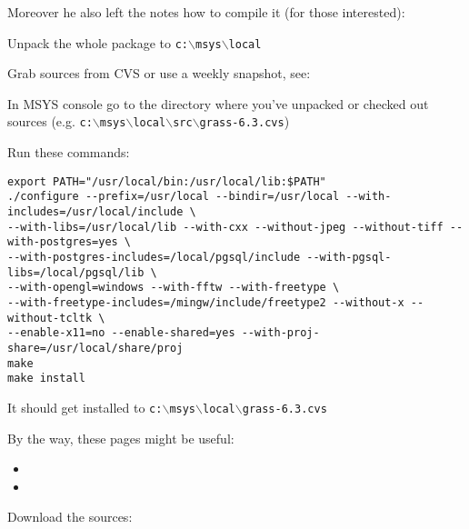Moreover he also left the notes how to compile it (for those interested):

	\begin{quotation}
	\end{quotation}

Unpack the whole package to \texttt{c:$\backslash$msys$\backslash$local}

Grab sources from CVS or use a weekly snapshot, see:

	\begin{quotation}
	\end{quotation}

In MSYS console go to the directory where you've unpacked or checked out sources
(e.g. \texttt{c:$\backslash$msys$\backslash$local$\backslash$src$\backslash$grass-6.3.cvs})

Run these commands:

\begin{verbatim}
export PATH="/usr/local/bin:/usr/local/lib:$PATH"
./configure --prefix=/usr/local --bindir=/usr/local --with-includes=/usr/local/include \
--with-libs=/usr/local/lib --with-cxx --without-jpeg --without-tiff --with-postgres=yes \
--with-postgres-includes=/local/pgsql/include --with-pgsql-libs=/local/pgsql/lib \
--with-opengl=windows --with-fftw --with-freetype \
--with-freetype-includes=/mingw/include/freetype2 --without-x --without-tcltk \
--enable-x11=no --enable-shared=yes --with-proj-share=/usr/local/share/proj
make
make install
\end{verbatim}

It should get installed to \texttt{c:$\backslash$msys$\backslash$local$\backslash$grass-6.3.cvs}

By the way, these pages might be useful:

\begin{itemize}
\item {}
\item {}
\end{itemize}

\minisec{GEOS}
Download the sources:

	\begin{quotation}
	\end{quotation}

